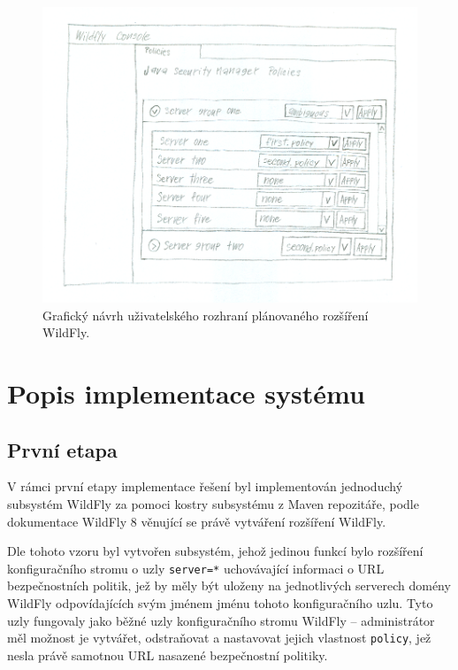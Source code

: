 \begin{figure}[ht]
  \centering
  \includegraphics[width=14cm]{fig/mockup}
  \caption{Grafický návrh uživatelského rozhraní plánovaného rozšíření WildFly.}
\end{figure}

\chapter{Popis implementace systému} \label{implementace}

\section{První etapa}

V rámci první etapy implementace řešení byl implementován jednoduchý subsystém WildFly za pomoci kostry subsystému z Maven repozitáře, podle dokumentace WildFly 8 věnující se právě vytváření rozšíření WildFly. \cite{WildFlyExtending}

Dle tohoto vzoru byl vytvořen subsystém, jehož jedinou funkcí bylo rozšíření konfiguračního stromu o uzly {\tt server=*} uchovávající informaci o URL bezpečnostních politik, jež by měly být uloženy na jednotlivých serverech domény WildFly odpovídajících svým jménem jménu tohoto konfiguračního uzlu. Tyto uzly fungovaly jako běžné uzly konfiguračního stromu WildFly -- administrátor měl možnost je vytvářet, odstraňovat a nastavovat jejich vlastnost {\tt policy}, jež nesla právě samotnou URL nasazené bezpečnostní politiky.

